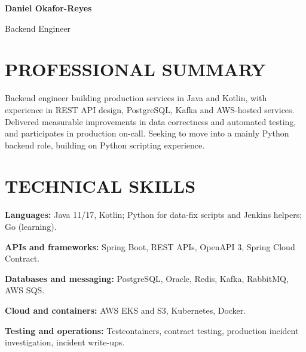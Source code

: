 \documentclass[11pt,a4paper]{article}
\newcommand{\cvsection}[1]{\section*{#1}}
\begin{document}
{\LARGE\bfseries\color{primarycolor} Daniel Okafor-Reyes}\par
{\large\color{accentcolor} Backend Engineer}

\cvsection{PROFESSIONAL SUMMARY}
Backend engineer building production services in Java and Kotlin, with experience in REST API design, PostgreSQL, Kafka and AWS-hosted services. Delivered measurable improvements in data correctness and automated testing, and participates in production on-call. Seeking to move into a mainly Python backend role, building on Python scripting experience.

\cvsection{TECHNICAL SKILLS}
\textbf{Languages:} Java 11/17, Kotlin; Python for data-fix scripts and Jenkins helpers; Go (learning).\par
\textbf{APIs and frameworks:} Spring Boot, REST APIs, OpenAPI 3, Spring Cloud Contract.\par
\textbf{Databases and messaging:} PostgreSQL, Oracle, Redis, Kafka, RabbitMQ, AWS SQS.\par
\textbf{Cloud and containers:} AWS EKS and S3, Kubernetes, Docker.\par
\textbf{Testing and operations:} Testcontainers, contract testing, production incident investigation, incident write-ups.
\end{document}
